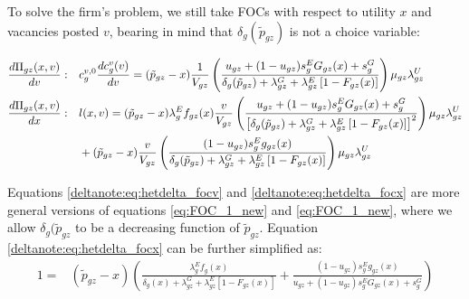 To solve the firm's problem, we still take FOCs with respect to utility $x$ and vacancies posted $v$, bearing in mind that $\delta_{g}(\tilde{p}_{gz})$ is not a choice variable:
%
\begin{small}
    \begin{align}
        \frac{\mathop{}\!{d} \Pi_{gz}(x,v)}{\mathop{}\!{d} v}: \quad & c_{g}^{v,0} \frac{\mathop{}\!{d} c_{g}^{v}(v)}{\mathop{}\!{d} v} = (\tilde{p}_{gz} - x) \frac{1}{V_{gz}} \left( \frac{ u_{gz} + (1 - u_{gz}) s_{g}^{E} G_{gz}(x) + s_{g}^{G} }{\delta_{g}(\tilde{p}_{gz}) + \lambda_{gz}^{G} + \lambda_{gz}^{E} \left[1 - F_{gz}(x)\right]} \right)  \mu_{gz} \lambda_{gz}^{U}   \label{deltanote:eq:hetdelta_focv} \\
        \frac{\mathop{}\!{d} \Pi_{gz}(x,v)}{\mathop{}\!{d} x}: \quad & l(x,v) = (\tilde{p}_{gz} - x) \lambda_{g}^{E} f_{gz}(x) \frac{v}{V_{gz}} \left( \frac{ u_{gz} + (1 - u_{gz}) s_{g}^{E} G_{gz}(x) + s_{g}^{G} }{\left[ \delta_{g}(\tilde{p}_{gz}) + \lambda_{gz}^{G} + \lambda_{gz}^{E} \left[1 - F_{gz}(x)\right] \right]^{2}} \right)  \mu_{gz} \lambda_{gz}^{U} \nonumber \\
        & + (\tilde{p}_{gz} - x) \frac{v}{V_{gz}} \left( \frac{ (1 - u_{gz}) s_{g}^{E} g_{gz}(x) }{ \delta_{g}(\tilde{p}_{gz}) + \lambda_{gz}^{G} + \lambda_{gz}^{E} \left[1 - F_{gz}(x)\right] } \right)  \mu_{gz} \lambda_{gz}^{U} \label{deltanote:eq:hetdelta_focx}
    \end{align}
\end{small}
%
Equations \eqref{deltanote:eq:hetdelta_focv} and \eqref{deltanote:eq:hetdelta_focx} are more general versions of equations \eqref{eq:FOC_1_new} and \eqref{eq:FOC_1_new}, where we allow $\delta_{g}(\tilde{p}_{gz}$ to be a decreasing function of $\tilde{p}_{gz}$. Equation \eqref{deltanote:eq:hetdelta_focx} can be further simplified as:
%
\begin{align}
    1 = & (\tilde{p}_{gz} - x) \left( \frac{\lambda_{g}^{E} f_{g}(x)}{ \delta_{g}(x) + \lambda_{gz}^{G} + \lambda_{gz}^{E} \left[1 - F_{gz}(x)\right] } + \frac{ (1 - u_{gz}) s_{g}^{E} g_{gz}(x) }{ u_{gz} + (1 - u_{gz}) s_{g}^{E} G_{gz}(x) + s_{g}^{G} } \right)  \label{deltanote:eq:hetdelta_focx2}
\end{align}
%
